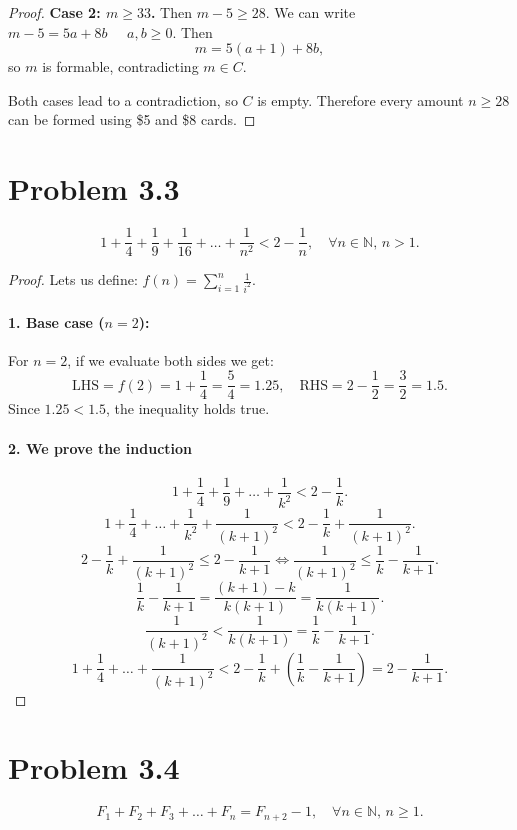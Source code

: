 \documentclass[12pt]{article}
\begin{document}
\begin{enumerate}[label=\alph*)]
\begin{proof}
\medskip

\noindent\textbf{Case 2: $m \ge 33$.} Then $m - 5 \ge 28$. We can write $m - 5 = 5a + 8b\;\;\;\;\;a, b \ge 0$. Then
\[
  m = 5(a+1) + 8b,
\]
so $m$ is formable, contradicting $m \in C$.

\medskip

Both cases lead to a contradiction, so $C$ is empty. Therefore every amount $n \ge 28$ can be formed using \$5 and \$8 cards.
\end{proof}

\end{enumerate}

\section*{Problem 3.3}


\[
1 + \frac{1}{4} + \frac{1}{9} + \frac{1}{16} + \dots + \frac{1}{n^2} < 2 - \frac{1}{n}, \quad \forall n \in \mathbb{N}, \, n > 1.
\]

\begin{proof}
Lets us define: $\displaystyle f(n)= \sum_{i=1}^{n} \frac{1}{i^2}$.

\paragraph{1. Base case ($n = 2$):}
For $n = 2$, if we evaluate both sides we get:
\[
\text{LHS} = f(2) = 1 + \frac{1}{4} = \frac{5}{4} = 1.25, \quad \text{RHS} = 2 - \frac{1}{2} = \frac{3}{2} = 1.5.
\]
Since $1.25 < 1.5$, the inequality holds true.

\paragraph{2. We prove the induction}
\[
1 + \frac{1}{4} + \frac{1}{9} + \dots + \frac{1}{k^2} < 2 - \frac{1}{k}.
\]
\[
1 + \frac{1}{4} + \dots + \frac{1}{k^2} + \frac{1}{(k+1)^2} < 2 - \frac{1}{k} + \frac{1}{(k+1)^2}.
\]
\[
2 - \frac{1}{k} + \frac{1}{(k+1)^2} \le 2 - \frac{1}{k+1} \iff \frac{1}{(k+1)^2} \le \frac{1}{k} - \frac{1}{k+1}.
\]
\[
\frac{1}{k} - \frac{1}{k+1} = \frac{(k+1) - k}{k(k+1)} = \frac{1}{k(k+1)}.
\]
\[
\frac{1}{(k+1)^2} < \frac{1}{k(k+1)} = \frac{1}{k} - \frac{1}{k+1}.
\]
\[
1 + \frac{1}{4} + \dots + \frac{1}{(k+1)^2} < 2 - \frac{1}{k} + \left(\frac{1}{k} - \frac{1}{k+1}\right) = 2 - \frac{1}{k+1}.
\]
\end{proof}
\section*{Problem 3.4}
\[
F_1 + F_2 + F_3 + \dots + F_n = F_{n+2} - 1, \quad \forall n \in \mathbb{N}, \, n \ge 1.
\]
\end{document}
